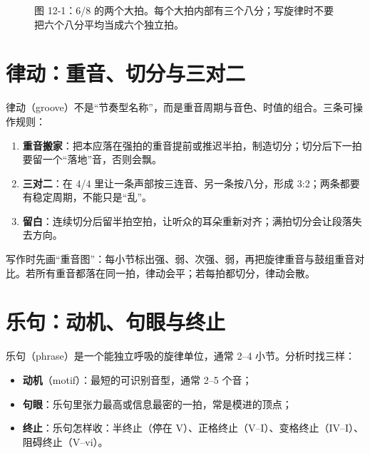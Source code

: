 \begin{figure}[htbp]
\centering
{}
\caption*{图 12-1：6/8 的两个大拍。每个大拍内部有三个八分；写旋律时不要把六个八分平均当成六个独立拍。}
\end{figure}

\section{律动：重音、切分与三对二}

律动（groove）不是“节奏型名称”，而是重音周期与音色、时值的组合。三条可操作规则：

\begin{enumerate}
  \item \textbf{重音搬家}：把本应落在强拍的重音提前或推迟半拍，制造切分；切分后下一拍要留一个“落地”音，否则会飘。
  \item \textbf{三对二}：在 4/4 里让一条声部按三连音、另一条按八分，形成 3:2；两条都要有稳定周期，不能只是“乱”。
  \item \textbf{留白}：连续切分后留半拍空拍，让听众的耳朵重新对齐；满拍切分会让段落失去方向。
\end{enumerate}

写作时先画“重音图”：每小节标出强、弱、次强、弱，再把旋律重音与鼓组重音对比。若所有重音都落在同一拍，律动会平；若每拍都切分，律动会散。

\section{乐句：动机、句眼与终止}

乐句（phrase）是一个能独立呼吸的旋律单位，通常 2–4 小节。分析时找三样：

\begin{itemize}
  \item \textbf{动机}（motif）：最短的可识别音型，通常 2–5 个音；
  \item \textbf{句眼}：乐句里张力最高或信息最密的一拍，常是模进的顶点；
  \item \textbf{终止}：乐句怎样收：半终止（停在 V）、正格终止（V--I）、变格终止（IV--I）、阻碍终止（V--vi）。
\end{itemize}

